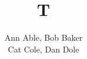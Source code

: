 \documentclass{emulateapj}
\begin{document}
\title{T}
\author{Ann Able, Bob Baker\\
Cat Cole, Dan Dole}
\maketitle
\end{document}
